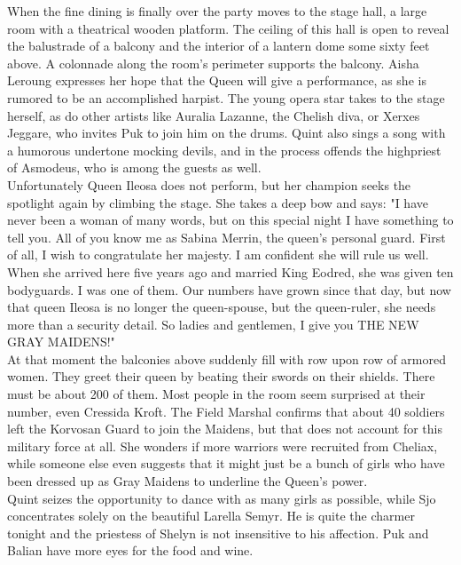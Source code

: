 When the fine dining is finally over the party moves to the stage hall, a large room with a theatrical wooden platform. The ceiling of this hall is open to reveal the balustrade of a balcony and the interior of a lantern dome some sixty feet above. A colonnade along the room's perimeter supports the balcony. Aisha Leroung expresses her hope that the Queen will give a performance, as she is rumored to be an accomplished harpist. The young opera star takes to the stage herself, as do other artists like Auralia Lazanne, the Chelish diva, or Xerxes Jeggare, who invites Puk to join him on the drums. Quint also sings a song with a humorous undertone mocking devils, and in the process offends the highpriest of Asmodeus, who is among the guests as well.\\

Unfortunately Queen Ileosa does not perform, but her champion seeks the spotlight again by climbing the stage. She takes a deep bow and says: "I have never been a woman of many words, but on this special night I have something to tell you. All of you know me as Sabina Merrin, the queen's personal guard. First of all, I wish to congratulate her majesty. I am confident she will rule  us well. When she arrived here five years ago and married King Eodred, she was given ten bodyguards. I was one of them. Our numbers have grown since that day, but now that queen Ileosa is no longer the queen-spouse, but the queen-ruler, she needs more than a security detail. So ladies and gentlemen, I give you THE NEW GRAY MAIDENS!"\\

At that moment the balconies above suddenly fill with row upon row of armored women. They greet their queen by beating their swords on their shields. There must be about 200 of them. Most people in the room seem surprised at their number, even Cressida Kroft. The Field Marshal confirms that about 40 soldiers left the Korvosan Guard to join the Maidens, but that does not account for this military force at all. She wonders if more warriors were recruited from Cheliax, while someone else even suggests that it might just be a bunch of girls who have been dressed up as Gray Maidens to underline the Queen's  power.\\

Quint seizes the opportunity to dance with as many girls as possible, while Sjo concentrates solely on the beautiful Larella Semyr. He is quite the charmer tonight and the priestess of Shelyn is not insensitive to his affection. Puk and Balian have more eyes for the food and wine.\\

